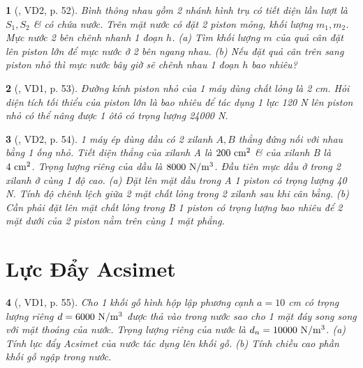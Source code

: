 \documentclass{article}
\newtheorem{baitoan}{}
\begin{document}
\begin{baitoan}[\cite{Van_Quyen_Hanh_Nhu_10_chuyen_Ly}, VD2, p. 52]
	Bình thông nhau gồm 2 nhánh hình trụ có tiết diện lần lượt là $S_1,S_2$ \& có chứa nước. Trên mặt nước có đặt 2 piston mỏng, khối lượng $m_1,m_2$. Mực nước 2 bên chênh nhanh 1 đoạn $h$. (a) Tìm khối lượng $m$ của quả cân đặt lên piston lớn để mực nước ở 2 bên ngang nhau. (b) Nếu đặt quả cân trên sang piston nhỏ thì mực nước bây giờ sẽ chênh nhau 1 đoạn $h$ bao nhiêu?
\end{baitoan}

\begin{baitoan}[\cite{Van_Quyen_Hanh_Nhu_10_chuyen_Ly}, VD1, p. 53]
	Đường kính piston nhỏ của 1 máy dùng chất lỏng là {\rm2 cm}. Hỏi diện tích tối thiểu của piston lớn là bao nhiêu để tác dụng 1 lực {\rm120 N} lên piston nhỏ có thể nâng được 1 ôtô có trọng lượng {\rm24000 N}.
\end{baitoan}

\begin{baitoan}[\cite{Van_Quyen_Hanh_Nhu_10_chuyen_Ly}, VD2, p. 54]
	1 máy ép dùng dầu có 2 xilanh $A,B$ thẳng đứng nối với nhau bằng 1 ống nhỏ. Tiết diện thẳng của xilanh A là $\rm200\ cm^2$ \& của xilanh B là $\rm4\ cm^2$. Trọng lượng riêng của dầu là $\rm8000\ N{\tt/}m^3$. Đầu tiên mực dầu ở trong 2 xilanh ở cùng 1 độ cao. (a) Đặt lên mặt dầu trong A 1 piston có trọng lượng {\rm40 N}. Tính độ chênh lệch giữa 2 mặt chất lỏng trong 2 xilanh sau khi cân bằng. (b) Cần phải đặt lên mặt chất lỏng trong B 1 piston có trọng lượng bao nhiêu để 2 mặt dưới của 2 piston nằm trên cùng 1 mặt phẳng.
\end{baitoan}


\section{Lực Đẩy Acsimet}


\begin{baitoan}[\cite{Van_Quyen_Hanh_Nhu_10_chuyen_Ly}, VD1, p. 55]
	Cho 1 khối gỗ hình hộp lập phương cạnh $a = 10$ {\rm cm} có trọng lượng riêng $d = 6000\ {\rm N{\tt/}m^3}$ được thả vào trong nước sao cho 1 mặt đáy song song với mặt thoáng của nước. Trọng lượng riêng của nước là $d_n = 10000\ {\rm N{\tt/}m^3}$. (a) Tính lực đẩy Acsimet của nước tác dụng lên khối gỗ. (b) Tính chiều cao phần khối gỗ ngập trong nước.
\end{baitoan}
\end{document}
